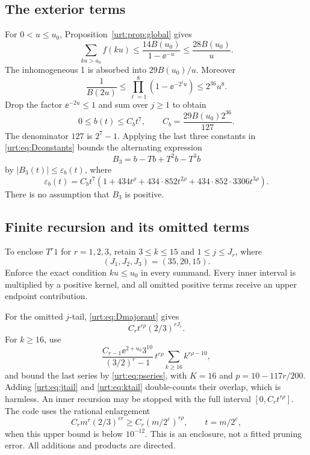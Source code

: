 \documentclass[11pt,letterpaper]{article}
\theoremstyle{remark}\newtheorem{remark}[theorem]{Remark}
\begin{document}
\subsection{The exterior terms}
For $0<u\le u_0$, Proposition~\ref{urt:prop:global} gives
\[
 \sum_{ku>u_0}f(ku)
 \le\frac{14B(u_0)}{1-\ee^{-u}}
 \le\frac{28B(u_0)}u.
\]
The inhomogeneous 1 is absorbed into $29B(u_0)/u$. Moreover
\[
 \frac1{B(2u)}\le\prod_{\ell=1}^{8}(1-\ee^{-2^\ell u})
      \le2^{36}u^8.
\]
Drop the factor $\ee^{-2u}\le1$ and sum over $j\ge1$ to obtain
\begin{equation}\label{urt:eq:bmajorant}
 0\le b(t)\le C_bt^7,\qquad C_b=\frac{29B(u_0)2^{36}}{127}.
\end{equation}
The denominator $127$ is $2^7-1$. Applying the last three constants in \eqref{urt:eq:Dconstants} bounds the alternating expression
\begin{equation}\label{urt:eq:B3}
 B_3=b-Tb+T^2b-T^3b
\end{equation}
by $|B_3(t)|\le\varepsilon_b(t)$, where
\begin{equation}\label{urt:eq:eb}
 \varepsilon_b(t)=C_bt^7\left(1+434t^\rho
 +434\cdot852t^{2\rho}+434\cdot852\cdot3306t^{3\rho}\right).
\end{equation}
There is no assumption that $B_3$ is positive.

\subsection{Finite recursion and its omitted terms}
To enclose $T^r1$ for $r=1,2,3$, retain $3\le k\le15$ and $1\le j\le J_r$, where
\begin{equation}\label{urt:eq:cutoffs}
 (J_1,J_2,J_3)=(35,20,15).
\end{equation}
Enforce the exact condition $ku\le u_0$ in every summand. Every inner interval is multiplied by a positive kernel, and all omitted positive terms receive an upper endpoint contribution.

For the omitted $j$-tail, \eqref{urt:eq:Dmajorant} gives
\begin{equation}\label{urt:eq:jtail}
 C_rt^{r\rho}(2/3)^{rJ_r}.
\end{equation}
For $k\ge16$, use
\begin{equation}\label{urt:eq:ktail}
 \frac{C_{r-1}\ee^{2+u_0}3^{10}}{(3/2)^r-1}\,
 t^{r\rho}\sum_{k\ge16}k^{r\rho-10},
\end{equation}
and bound the last series by \eqref{urt:eq:pseries}, with $K=16$ and $p=10-117r/200$. Adding \eqref{urt:eq:jtail} and \eqref{urt:eq:ktail} double-counts their overlap, which is harmless. An inner recursion may be stopped with the full interval $[0,C_rt^{r\rho}]$. The code uses the rational enlargement
\[
 C_r m^r(2/3)^{er}\ge C_r(m/2^e)^{r\rho},\qquad t=m/2^e,
\]
when this upper bound is below $10^{-12}$. This is an enclosure, not a fitted pruning error. All additions and products are directed.
\end{document}
